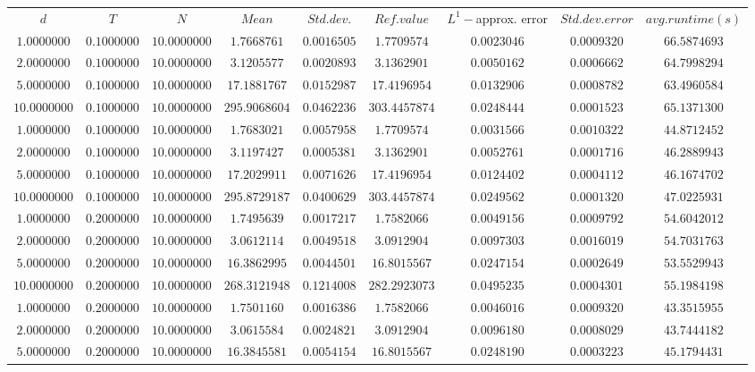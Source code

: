 \begin{tabular}{ccccccccc}
$d$ & $T$ & $N$ & $Mean$ & $Std. dev.$ & $Ref. value$ & $L^1-$approx. error & $Std. dev. error$ & $avg. runtime (s)$\\
$1.0000000$ & $0.1000000$ & $10.0000000$ & $1.7668761$ & $0.0016505$ & $1.7709574$ & $0.0023046$ & $0.0009320$ & $66.5874693$\\
$2.0000000$ & $0.1000000$ & $10.0000000$ & $3.1205577$ & $0.0020893$ & $3.1362901$ & $0.0050162$ & $0.0006662$ & $64.7998294$\\
$5.0000000$ & $0.1000000$ & $10.0000000$ & $17.1881767$ & $0.0152987$ & $17.4196954$ & $0.0132906$ & $0.0008782$ & $63.4960584$\\
$10.0000000$ & $0.1000000$ & $10.0000000$ & $295.9068604$ & $0.0462236$ & $303.4457874$ & $0.0248444$ & $0.0001523$ & $65.1371300$\\
$1.0000000$ & $0.1000000$ & $10.0000000$ & $1.7683021$ & $0.0057958$ & $1.7709574$ & $0.0031566$ & $0.0010322$ & $44.8712452$\\
$2.0000000$ & $0.1000000$ & $10.0000000$ & $3.1197427$ & $0.0005381$ & $3.1362901$ & $0.0052761$ & $0.0001716$ & $46.2889943$\\
$5.0000000$ & $0.1000000$ & $10.0000000$ & $17.2029911$ & $0.0071626$ & $17.4196954$ & $0.0124402$ & $0.0004112$ & $46.1674702$\\
$10.0000000$ & $0.1000000$ & $10.0000000$ & $295.8729187$ & $0.0400629$ & $303.4457874$ & $0.0249562$ & $0.0001320$ & $47.0225931$\\
$1.0000000$ & $0.2000000$ & $10.0000000$ & $1.7495639$ & $0.0017217$ & $1.7582066$ & $0.0049156$ & $0.0009792$ & $54.6042012$\\
$2.0000000$ & $0.2000000$ & $10.0000000$ & $3.0612114$ & $0.0049518$ & $3.0912904$ & $0.0097303$ & $0.0016019$ & $54.7031763$\\
$5.0000000$ & $0.2000000$ & $10.0000000$ & $16.3862995$ & $0.0044501$ & $16.8015567$ & $0.0247154$ & $0.0002649$ & $53.5529943$\\
$10.0000000$ & $0.2000000$ & $10.0000000$ & $268.3121948$ & $0.1214008$ & $282.2923073$ & $0.0495235$ & $0.0004301$ & $55.1984198$\\
$1.0000000$ & $0.2000000$ & $10.0000000$ & $1.7501160$ & $0.0016386$ & $1.7582066$ & $0.0046016$ & $0.0009320$ & $43.3515955$\\
$2.0000000$ & $0.2000000$ & $10.0000000$ & $3.0615584$ & $0.0024821$ & $3.0912904$ & $0.0096180$ & $0.0008029$ & $43.7444182$\\
$5.0000000$ & $0.2000000$ & $10.0000000$ & $16.3845581$ & $0.0054154$ & $16.8015567$ & $0.0248190$ & $0.0003223$ & $45.1794431$\\

\end{tabular}
